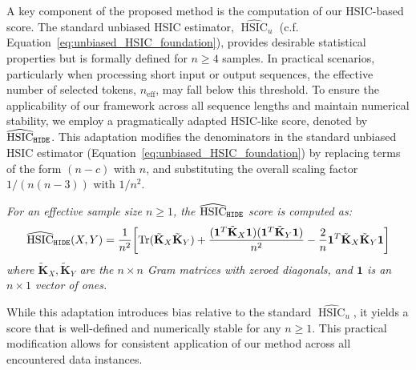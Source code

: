 A key component of the proposed method is the computation of our HSIC-based score. The standard unbiased HSIC estimator, $\widehat{\operatorname{HSIC}}_u$ (c.f. Equation~\ref{eq:unbiased_HSIC_foundation}), provides desirable statistical properties but is formally defined for $n \ge 4$ samples. In practical scenarios, particularly when processing short input or output sequences, the effective number of selected tokens, $n_{\text{eff}}$, may fall below this threshold. To ensure the applicability of our framework across all sequence lengths and maintain numerical stability, we employ a pragmatically adapted HSIC-like score, denoted by $\widehat{\operatorname{HSIC}}_{\text{\method}}$. This adaptation modifies the denominators in the standard unbiased HSIC estimator (Equation~\ref{eq:unbiased_HSIC_foundation}) by replacing terms of the form $(n - c)$ with $n$, and substituting the overall scaling factor $1/(n(n - 3))$ with $1/n^2$.

\begin{definition}
\label{def:hsic_irid_modified}
\textit{For an effective sample size $n \ge 1$, the $\widehat{\operatorname{HSIC}}_{\text{\method}}$ score is computed as:}
\begin{multline}
\widehat{\operatorname{HSIC}}_{\text{\method}}(X,Y) = \frac{1}{n^2} \bigg[ 
\text{Tr}(\tilde{\mathbf{K}}_X\tilde{\mathbf{K}}_Y) +
\frac{(\mathbf{1}^T \tilde{\mathbf{K}}_X \mathbf{1}) (\mathbf{1}^T \tilde{\mathbf{K}}_Y \mathbf{1})}{n^2} - \frac{2}{n} \mathbf{1}^T \tilde{\mathbf{K}}_X\tilde{\mathbf{K}}_Y \mathbf{1} \bigg]
\label{eq:hide-score}
\end{multline}
\textit{where $\tilde{\mathbf{K}}_X, \tilde{\mathbf{K}}_Y$ are the $n \times n$ Gram matrices with zeroed diagonals, and $\mathbf{1}$ is an $n \times 1$ vector of ones.}
\end{definition}
While this adaptation introduces bias relative to the standard $\widehat{\operatorname{HSIC}}_u$, it yields a score that is well-defined and numerically stable for any $n \ge 1$. This practical modification allows for consistent application of our method across all encountered data instances. 


